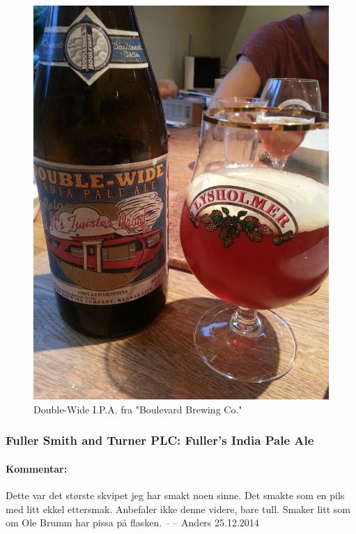 \documentclass[12pt,a4paper,oneside,norsk]{article}
\begin{document}
\begin{figure} [H]
\centering
\includegraphics[scale=0.1, angle=270]{Bilder/Ol/Double-Wide.jpg}
\caption{Double-Wide I.P.A. fra "Boulevard Brewing Co."}
\end{figure}

\newpage
\subsubsection{Fuller Smith and Turner PLC: Fuller's India Pale Ale}
\paragraph{Kommentar:} Dette var det største skvipet jeg har smakt noen sinne. Det smakte som en pils med litt ekkel ettersmak. Anbefaler ikke denne videre, bare tull. Smaker litt som om Ole Brumm har pissa på flasken.
\newline
-- -- Anders 25.12.2014
\end{document}
